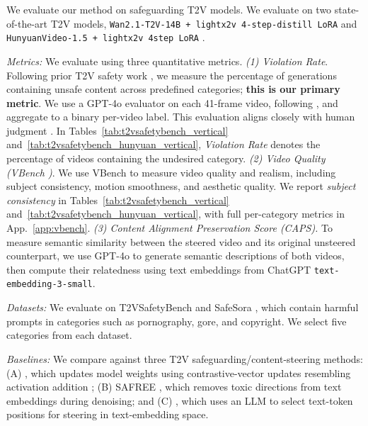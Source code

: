 \documentclass{article}
\begin{document}
We evaluate our method on safeguarding T2V models. We evaluate on two state-of-the-art T2V models, \texttt{Wan2.1-T2V-14B + lightx2v 4-step-distill LoRA} \cite{wan2025wan} and \texttt{HunyuanVideo-1.5 + lightx2v 4step LoRA} \cite{kong2024hunyuanvideo}.

\noindent \textit{Metrics:\quad} We evaluate using three quantitative metrics. \textit{(1) Violation Rate}. Following prior T2V safety work \cite{miao2024t2vsafetybench,dai2024safesora}, we measure the percentage of generations containing unsafe content across predefined categories; \textbf{this is our primary metric}. We use a GPT-4o evaluator on each 41-frame video, following \cite[Fig.~3]{miao2024t2vsafetybench}, and aggregate to a binary per-video label. This evaluation aligns closely with human judgment \cite{miao2024t2vsafetybench}. In Tables~\ref{tab:t2vsafetybench_vertical} and~\ref{tab:t2vsafetybench_hunyuan_vertical}, \textit{Violation Rate} denotes the percentage of videos containing the undesired category. \textit{(2) Video Quality (VBench \cite{huang2024vbench})}. We use VBench \cite{huang2024vbench} to measure video quality and realism, including subject consistency, motion smoothness, and aesthetic quality. We report \textit{subject consistency} in Tables~\ref{tab:t2vsafetybench_vertical} and~\ref{tab:t2vsafetybench_hunyuan_vertical}, with full per-category metrics in App.~\ref{app:vbench}.
\textit{(3) Content Alignment Preservation Score (CAPS).} To measure semantic similarity between the steered video and its original unsteered counterpart, we use GPT-4o to generate semantic descriptions of both videos, then compute their relatedness using text embeddings from ChatGPT \texttt{text-embedding-3-small}.

\noindent \textit{Datasets:\quad} We evaluate on T2VSafetyBench \cite{miao2024t2vsafetybench} and SafeSora \cite{dai2024safesora}, which contain harmful prompts in categories such as pornography, gore, and copyright. We select five categories from each dataset.

\noindent \textit{Baselines:\quad} We compare against three T2V safeguarding/content-steering methods: (A) \cite{facchiano2025video}, which updates model weights using contrastive-vector updates resembling activation addition \cite{turner2024activation}; (B) SAFREE \cite{yoon2024safree}, which removes toxic directions from text embeddings during denoising; and (C) \cite{ekin2026unreasonable}, which uses an LLM to select text-token positions for steering in text-embedding space.
\end{document}
